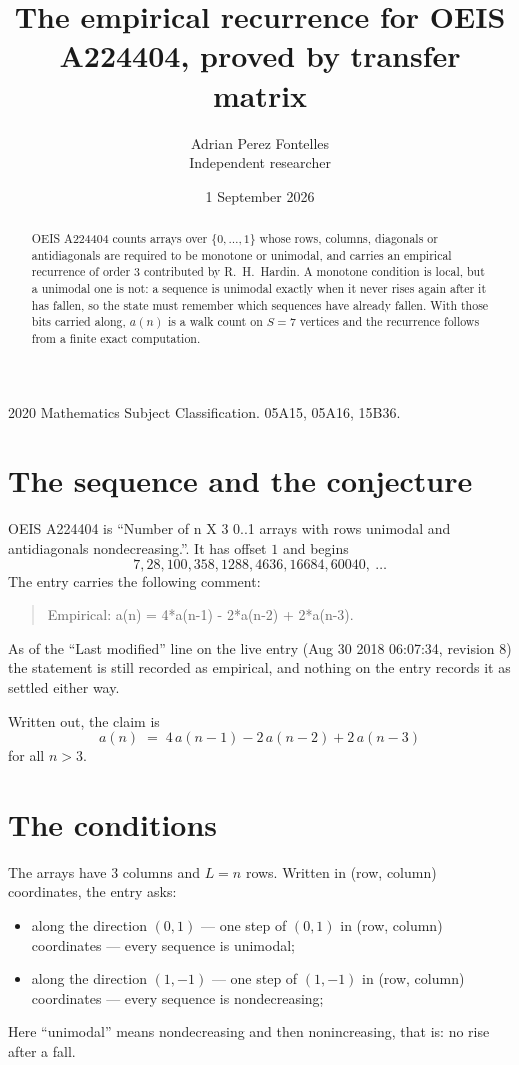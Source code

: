 \documentclass[11pt,a4paper]{article}
\title{The empirical recurrence for OEIS A224404, proved by transfer matrix}
\author{Adrian Perez Fontelles\\ \small Independent researcher}
\date{1 September 2026}
\theoremstyle{plain}
\theoremstyle{definition}
\begin{document}
\maketitle

\begin{abstract}
OEIS A224404 counts arrays over $\{0,\dots,1\}$ whose rows, columns, diagonals or
antidiagonals are required to be monotone or unimodal, and carries an empirical recurrence of
order $3$ contributed by R.~H.~Hardin. A monotone condition is local, but a unimodal one
is not: a sequence is unimodal exactly when it never rises again after it has fallen, so the
state must remember which sequences have already fallen. With those bits carried along, $a(n)$
is a walk count on $S=7$ vertices and the recurrence follows from a finite exact
computation.
\end{abstract}

\noindent\small 2020 Mathematics Subject Classification. 05A15, 05A16, 15B36.\normalsize

\section{The sequence and the conjecture}

OEIS A224404 is ``Number of n X 3 0..1 arrays with rows unimodal and antidiagonals nondecreasing.''. It has offset $1$ and begins
\[
7, 28, 100, 358, 1288, 4636, 16684, 60040,\ \dots
\]
The entry carries the following comment:
\begin{quote}\small
Empirical: a(n) = 4*a(n-1) - 2*a(n-2) + 2*a(n-3).
\end{quote}
As of the ``Last modified'' line on the live entry (Aug 30 2018 06:07:34, revision 8) the statement is
still recorded as empirical, and nothing on the entry records it as settled either way.

Written out, the claim is
\begin{equation}\label{eq:conj}
a(n)\;=\;4\,a(n-1) - 2\,a(n-2) + 2\,a(n-3)
\end{equation}
for all $n>3$.

\section{The conditions}

The arrays have $3$ columns and $L=n$ rows. Written in (row, column)
coordinates, the entry asks:
\begin{itemize}
\item along the direction $(0,1)$ --- one step of $(0,1)$ in (row, column) coordinates --- every sequence is unimodal;
\item along the direction $(1,-1)$ --- one step of $(1,-1)$ in (row, column) coordinates --- every sequence is nondecreasing;
\end{itemize}
Here ``unimodal'' means nondecreasing and then nonincreasing, that is: no rise after a fall.
\end{document}
